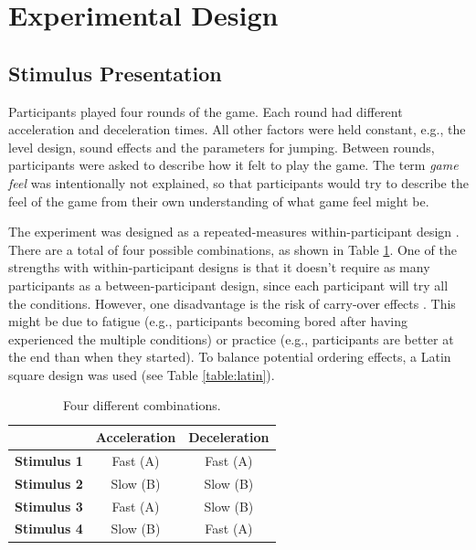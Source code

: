 \section{Experimental Design} \label{experimentalDesign}

\subsection{Stimulus Presentation}
Participants played four rounds of the game. Each round had different acceleration and deceleration times. All other factors were held constant, e.g., the level design, sound effects and the parameters for jumping. Between rounds, participants were asked to describe how it felt to play the game. The term \textit{game feel} was intentionally not explained, so that participants would try to describe the feel of the game from their own understanding of what game feel might be.

The experiment was designed as a repeated-measures within-participant design \cite{cunningham}. There are a total of four possible combinations, as shown in Table \ref{tab:combinations}. One of the strengths with within-participant designs is that it doesn't require as many participants as a between-participant design, since each participant will try all the conditions. However, one disadvantage is the risk of carry-over effects \cite{experimental1}. This might be due to fatigue (e.g., participants becoming bored after having experienced the multiple conditions) or practice (e.g., participants are better at the end than when they started). To balance potential ordering effects, a Latin square design was used (see Table \ref{table:latin}).

\begin{table} \centering
\caption{Four different combinations.}
\label{tab:combinations}
\begin{tabular}{ccc}
\toprule
& \textbf{Acceleration} & \textbf{Deceleration} \\
\midrule
\textbf{Stimulus 1} & Fast (A) & Fast (A)\\
\textbf{Stimulus 2} & Slow (B) & Slow (B)\\
\textbf{Stimulus 3} & Fast (A) & Slow (B)\\
\textbf{Stimulus 4} & Slow (B) & Fast (A)\\
\bottomrule
\end{tabular}
\end{table}

